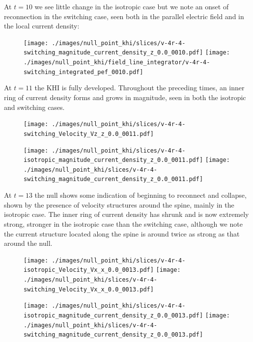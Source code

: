 At $t=10$ we see little change in the isotropic case but we note an onset of reconnection in the switching case, seen both in the parallel electric field and in the local current density:

\begin{figure}[H]
  \centering
  \texttt{[image: ./images/null\_point\_khi/slices/v-4r-4-switching\_magnitude\_current\_density\_z\_0.0\_0010.pdf]}
  \texttt{[image: ./images/null\_point\_khi/field\_line\_integrator/v-4r-4-switching\_integrated\_pef\_0010.pdf]}
\end{figure}

At $t=11$ the KHI is fully developed. Throughout the preceding times, an inner ring of current density forms and grows in magnitude, seen in both the isotropic and switching cases.

\begin{figure}[H]
  \centering
  \texttt{[image: ./images/null\_point\_khi/slices/v-4r-4-switching\_Velocity\_Vz\_z\_0.0\_0011.pdf]}
\end{figure}

\begin{figure}[H]
  \centering
  \texttt{[image: ./images/null\_point\_khi/slices/v-4r-4-isotropic\_magnitude\_current\_density\_z\_0.0\_0011.pdf]}
  \texttt{[image: ./images/null\_point\_khi/slices/v-4r-4-switching\_magnitude\_current\_density\_z\_0.0\_0011.pdf]}
\end{figure}

At $t=13$ the null shows some indication of beginning to reconnect and collapse, shown by the presence of velocity structures around the spine, mainly in the isotropic case. The inner ring of current density has shrunk and is now extremely strong, stronger in the isotropic case than the switching case, although we note the current structure located along the spine is around twice as strong as that around the null.

\begin{figure}[H]
  \centering
  \texttt{[image: ./images/null\_point\_khi/slices/v-4r-4-isotropic\_Velocity\_Vx\_x\_0.0\_0013.pdf]}
  \texttt{[image: ./images/null\_point\_khi/slices/v-4r-4-switching\_Velocity\_Vx\_x\_0.0\_0013.pdf]}
\end{figure}

\begin{figure}[H]
  \centering
  \texttt{[image: ./images/null\_point\_khi/slices/v-4r-4-isotropic\_magnitude\_current\_density\_z\_0.0\_0013.pdf]}
  \texttt{[image: ./images/null\_point\_khi/slices/v-4r-4-switching\_magnitude\_current\_density\_z\_0.0\_0013.pdf]}
\end{figure}

